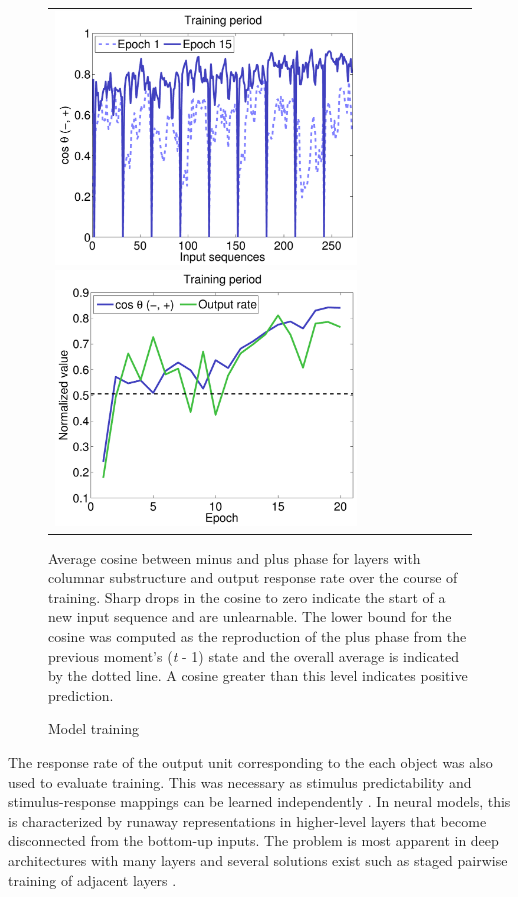 \documentclass[dwyatte_dissertation.tex]{subfiles}
\begin{document}
\begin{figure}[h!]
\begin{center}
\begin{tabular}{ll}
\includegraphics[width=80mm]{figs/chap_sims/sims_cos_out_trl.pdf}
\includegraphics[width=80mm]{figs/chap_sims/sims_cos_out_epc.pdf}
\end{tabular}
\end{center}
\caption{Model training}{Average cosine between minus and plus phase for layers with columnar substructure and output response rate over the course of training. Sharp drops in the cosine to zero indicate the start of a new input sequence and are unlearnable. The lower bound for the cosine was computed as the reproduction of the plus phase from the previous moment's (\textit{t} - 1) state and the overall average is indicated by the dotted line. A cosine greater than this level indicates positive prediction.}
\label{fig:v1_v2_output_train}
\end{figure}

The response rate of the output unit corresponding to the each object was also used to evaluate training. This was necessary as stimulus predictability and stimulus-response mappings can be learned independently \cite{WyartNobreSummerfield12,KokRahnevJeheeEtAl12}. In neural models, this is characterized by runaway representations in higher-level layers that become disconnected from the bottom-up inputs. The problem is most apparent in deep architectures with many layers and several solutions exist such as staged pairwise training of adjacent layers \cite{HintonSalakhutdinov06}.
\end{document}
